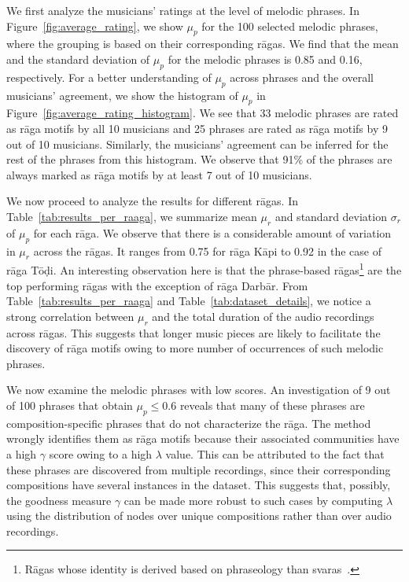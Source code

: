 We first analyze the musicians' ratings at the level of melodic phrases. In Figure~\ref{fig:average_rating}, we show $\mu_p$ for the 100 selected melodic phrases, where the grouping is based on their corresponding r\={a}gas. We find that the mean and the standard deviation of $\mu_p$ for the melodic phrases is 0.85 and 0.16, respectively. For a better understanding of $\mu_p$ across phrases and the overall musicians' agreement, we show the histogram of $\mu_p$ in Figure~\ref{fig:average_rating_histogram}. We see that 33 melodic phrases are rated as r\={a}ga motifs by all 10 musicians and 25 phrases are rated as r\={a}ga motifs by 9 out of 10 musicians. Similarly, the musicians' agreement can be inferred for the rest of the phrases from this histogram. We observe that 91\% of the phrases are always marked as r\={a}ga motifs by at least 7 out of 10 musicians. 


We now proceed to analyze the results for different r\={a}gas. In Table~\ref{tab:results_per_raaga}, we summarize mean $\mu_r$ and standard deviation $\sigma_r$ of $\mu_p$ for each r\={a}ga. We observe that there is a considerable amount of variation in $\mu_r$ across the r\={a}gas. It ranges from 0.75 for r\={a}ga K\={a}pi to 0.92 in the case of r\={a}ga T\={o}\d{d}i. An interesting observation here is that the phrase-based r\={a}gas\footnote{R\={a}gas whose identity is derived based on phraseology than svaras~\cite{krishna2012carnatic}.} are the top performing r\={a}gas with the  exception of r\={a}ga Darb\={a}r. From Table~\ref{tab:results_per_raaga} and Table~\ref{tab:dataset_details}, we notice a strong correlation between $\mu_r$ and the total duration of the audio recordings across r\={a}gas. This suggests that longer music pieces are likely to facilitate the discovery of r\={a}ga motifs owing to more number of occurrences of such melodic phrases.

We now examine the melodic phrases with low scores. An investigation of 9 out of 100 phrases that obtain $\mu_p\leq0.6$ reveals that many of these phrases are composition-specific phrases that do not characterize the r\={a}ga. The method wrongly identifies them as r\={a}ga motifs because their associated communities have a high $\gamma$ score owing to a high $\lambda$ value. This can be attributed to the fact that these phrases are discovered from multiple recordings, since their corresponding compositions have several instances in the dataset.  This suggests that, possibly, the goodness measure $\gamma$ can be made more robust to such cases by computing $\lambda$ using the distribution of nodes over unique compositions rather than over audio recordings.

